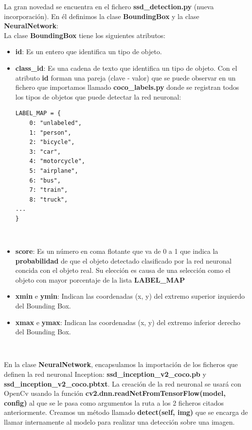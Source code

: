 La gran novedad se encuentra en el fichero \textbf{ssd\_detection.py} (nueva incorporación). En él definimos la clase \textbf{BoundingBox} y la clase \textbf{NeuralNetwork}:\\

La clase \textbf{BoundingBox} tiene los siguientes atributos:
\begin{itemize}
	\item \textbf{id}: Es un entero que identifica un tipo de objeto.
	\item \textbf{class\_id}: Es una cadena de texto que identifica un tipo de objeto. Con el atributo \textbf{id} forman una pareja (clave - valor) que se puede observar en un fichero que importamos llamado \textbf{coco\_labels.py} donde se registran todos los tipos de objetos que puede detectar la red neuronal:\\
\begin{lstlisting}
LABEL_MAP = {
    0: "unlabeled",
    1: "person",
    2: "bicycle",
    3: "car",
    4: "motorcycle",
    5: "airplane",
    6: "bus",
    7: "train",
    8: "truck",
...
}
\end{lstlisting}\
	\item \textbf{score}: Es un número en coma flotante que va de 0 a 1 que indica la \textbf{probabilidad} de que el objeto detectado clasificado por la red neuronal concida con el objeto real. Su elección es causa de una selección como el objeto con mayor porcentaje de la lista \textbf{LABEL\_MAP}
	\item \textbf{xmin} e \textbf{ymin}: Indican las coordenadas (x, y) del extremo superior izquierdo del Bounding Box.
	\item \textbf{xmax} e \textbf{ymax}: Indican las coordenadas (x, y) del extremo inferior derecho del Bounding Box.
\end{itemize}\

En la clase \textbf{NeuralNetwork}, encapsulamos la importación de los ficheros que definen la red neuronal Inception: \textbf{ssd\_inception\_v2\_coco.pb} y \textbf{ssd\_inception\_v2\_coco.pbtxt}. La creación de la red neuronal se usará con OpenCv usando la función \textbf{cv2.dnn.readNetFromTensorFlow(model, config)} al que se le pasa como argumentos la ruta a los 2 ficheros citados anteriormente. Creamos un método llamado \textbf{detect(self, img)} que se encarga de llamar internamente al modelo para realizar una detección sobre una imagen.\\

